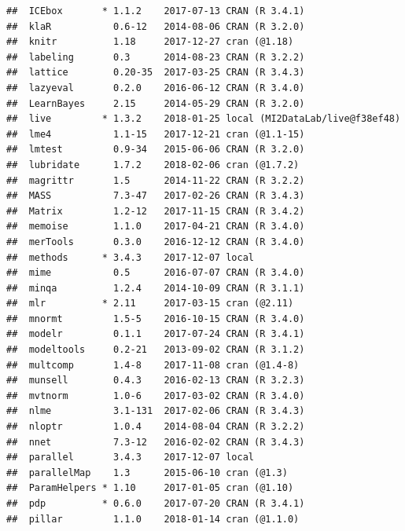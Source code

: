 \documentclass[]{book}
\theoremstyle{definition}
\theoremstyle{definition}
\theoremstyle{definition}
\theoremstyle{remark}
\begin{document}
\begin{verbatim}
##  ICEbox       * 1.1.2    2017-07-13 CRAN (R 3.4.1)                        
##  klaR           0.6-12   2014-08-06 CRAN (R 3.2.0)                        
##  knitr          1.18     2017-12-27 cran (@1.18)                          
##  labeling       0.3      2014-08-23 CRAN (R 3.2.2)                        
##  lattice        0.20-35  2017-03-25 CRAN (R 3.4.3)                        
##  lazyeval       0.2.0    2016-06-12 CRAN (R 3.4.0)                        
##  LearnBayes     2.15     2014-05-29 CRAN (R 3.2.0)                        
##  live         * 1.3.2    2018-01-25 local (MI2DataLab/live@f38ef48)       
##  lme4           1.1-15   2017-12-21 cran (@1.1-15)                        
##  lmtest         0.9-34   2015-06-06 CRAN (R 3.2.0)                        
##  lubridate      1.7.2    2018-02-06 cran (@1.7.2)                         
##  magrittr       1.5      2014-11-22 CRAN (R 3.2.2)                        
##  MASS           7.3-47   2017-02-26 CRAN (R 3.4.3)                        
##  Matrix         1.2-12   2017-11-15 CRAN (R 3.4.2)                        
##  memoise        1.1.0    2017-04-21 CRAN (R 3.4.0)                        
##  merTools       0.3.0    2016-12-12 CRAN (R 3.4.0)                        
##  methods      * 3.4.3    2017-12-07 local                                 
##  mime           0.5      2016-07-07 CRAN (R 3.4.0)                        
##  minqa          1.2.4    2014-10-09 CRAN (R 3.1.1)                        
##  mlr          * 2.11     2017-03-15 cran (@2.11)                          
##  mnormt         1.5-5    2016-10-15 CRAN (R 3.4.0)                        
##  modelr         0.1.1    2017-07-24 CRAN (R 3.4.1)                        
##  modeltools     0.2-21   2013-09-02 CRAN (R 3.1.2)                        
##  multcomp       1.4-8    2017-11-08 cran (@1.4-8)                         
##  munsell        0.4.3    2016-02-13 CRAN (R 3.2.3)                        
##  mvtnorm        1.0-6    2017-03-02 CRAN (R 3.4.0)                        
##  nlme           3.1-131  2017-02-06 CRAN (R 3.4.3)                        
##  nloptr         1.0.4    2014-08-04 CRAN (R 3.2.2)                        
##  nnet           7.3-12   2016-02-02 CRAN (R 3.4.3)                        
##  parallel       3.4.3    2017-12-07 local                                 
##  parallelMap    1.3      2015-06-10 cran (@1.3)                           
##  ParamHelpers * 1.10     2017-01-05 cran (@1.10)                          
##  pdp          * 0.6.0    2017-07-20 CRAN (R 3.4.1)                        
##  pillar         1.1.0    2018-01-14 cran (@1.1.0)                         

\end{verbatim}
\end{document}

